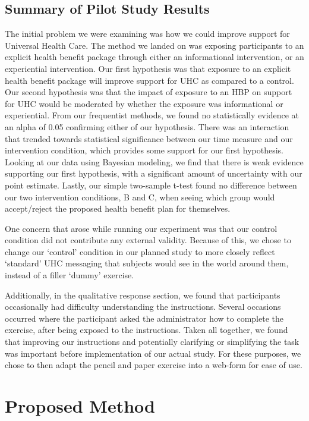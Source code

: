\documentclass[
]{article}
\begin{document}
\hypertarget{summary-of-pilot-study-results}{%
\subsection{Summary of Pilot Study
Results}\label{summary-of-pilot-study-results}}

The initial problem we were examining was how we could improve support
for Universal Health Care. The method we landed on was exposing
participants to an explicit health benefit package through either an
informational intervention, or an experiential intervention. Our first
hypothesis was that exposure to an explicit health benefit package will
improve support for UHC as compared to a control. Our second hypothesis
was that the impact of exposure to an HBP on support for UHC would be
moderated by whether the exposure was informational or experiential.
From our frequentist methods, we found no statistically evidence at an
alpha of 0.05 confirming either of our hypothesis. There was an
interaction that trended towards statistical significance between our
time measure and our intervention condition, which provides some support
for our first hypothesis. Looking at our data using Bayesian modeling,
we find that there is weak evidence supporting our first hypothesis,
with a significant amount of uncertainty with our point estimate.
Lastly, our simple two-sample t-test found no difference between our two
intervention conditions, B and C, when seeing which group would
accept/reject the proposed health benefit plan for themselves.

One concern that arose while running our experiment was that our control
condition did not contribute any external validity. Because of this, we
chose to change our `control' condition in our planned study to more
closely reflect `standard' UHC messaging that subjects would see in the
world around them, instead of a filler `dummy' exercise.

Additionally, in the qualitative response section, we found that
participants occasionally had difficulty understanding the instructions.
Several occasions occurred where the participant asked the administrator
how to complete the exercise, after being exposed to the instructions.
Taken all together, we found that improving our instructions and
potentially clarifying or simplifying the task was important before
implementation of our actual study. For these purposes, we chose to then
adapt the pencil and paper exercise into a web-form for ease of use.

\hypertarget{proposed-method}{%
\section{Proposed Method}\label{proposed-method}}
\end{document}
